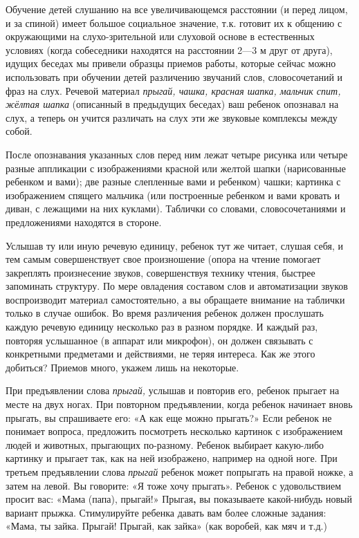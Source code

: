 \documentclass[a5paper]{book}
\renewcommand{\emph}[1]{\textit{#1}}
\begin{document}
Обучение детей слушанию на все увеличивающемся расстоянии (и перед
лицом, и за спиной) имеет большое социальное значение, т.к. готовит их к
общению с окружающими на слухо-зрительной или слуховой основе в
естественных условиях (когда собеседники находятся на расстоянии 2---3 м
друг от друга), идущих беседах мы привели образцы приемов работы,
которые сейчас можно использовать при обучении детей различению звучаний
слов, словосочетаний и фраз на слух. Речевой материал \emph{прыгай,
чашка, красная шапка, мальчик спит, жёлтая шапка} (описанный в
предыдущих беседах) ваш ребенок опознавал на слух, а теперь он учится
различать на слух эти же звуковые комплексы между собой.

После опознавания указанных слов перед ним лежат четыре рисунка или
четыре разные аппликации с изображениями красной или желтой шапки
(нарисованные ребенком и вами); две разные слепленные вами и ребенком)
чашки; картинка с изображением спящего мальчика (или построенные
ребенком и вами кровать и диван, с лежащими на них куклами). Таблички со
словами, словосочетаниями и предложениями находятся в стороне.

Услышав ту или иную речевую единицу, ребенок тут же читает, слушая себя,
и тем самым совершенствует свое произношение (опора на чтение помогает
закреплять произнесение звуков, совершенствуя технику чтения, быстрее
запоминать структуру. По мере овладения составом слов и автоматизации
звуков воспроизводит материал самостоятельно, а вы обращаете внимание на
таблички только в случае ошибок. Во время различения ребенок должен
прослушать каждую речевую единицу несколько раз в разном порядке. И
каждый раз, повторяя услышанное (в аппарат или микрофон), он должен
связывать с конкретными предметами и действиями, не теряя интереса. Как
же этого добиться? Приемов много, укажем лишь на некоторые.

При предъявлении слова \emph{прыгай,} услышав и повторив его, ребенок
прыгает на месте на двух ногах. При повторном предъявлении, когда
ребенок начинает вновь прыгать, вы спрашиваете его: «А как еще можно
прыгать?» Если ребенок не понимает вопроса, предложить посмотреть
несколько картинок с изображением людей и животных, прыгающих
по-разному. Ребенок выбирает какую-либо картинку и прыгает так, как на
ней изображено, например на одной ноге. При третьем предъявлении слова
\emph{прыгай} ребенок может попрыгать на правой ножке, а затем на левой.
Вы говорите: «Я тоже хочу прыгать». Ребенок с удовольствием просит вас:
«Мама (папа), прыгай!» Прыгая\textbf{,} вы показываете какой-нибудь
новый вариант прыжка. Стимулируйте ребенка давать вам более сложные
задания: «Мама, ты зайка. Прыгай! Прыгай, как зайка» (как воробей, как
мяч и т.д.)
\end{document}
